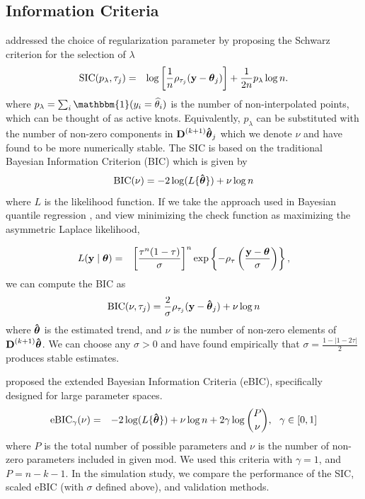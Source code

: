 \documentclass[aoas]{imsart}
\newcommand{\One}{\mathbbm{1}}
\newcommand{\V}[1]{{\bm{\mathbf{\MakeLowercase{#1}}}}} %
\newcommand{\VE}[2]{\MakeLowercase{#1}_{#2}} %
\newcommand{\Vhat}[1]{{\bm{\hat \mathbf{\MakeLowercase{#1}}}}} %
\newcommand{\M}[1]{{\bm{\mathbf{\MakeUppercase{#1}}}}} %
\newcommand{\Mn}[2]{\M{#1}^{(#2)}} %
\begin{document}
\subsection{Information Criteria}
\cite{KoenkerNgPortnoy1994} addressed the choice of regularization parameter by proposing the Schwarz criterion for the selection of $\lambda$
\begin{eqnarray*}
	\label{eq:SIC}
	\mbox{SIC}(p_{\lambda}, \tau_j) & = & \log\left[\frac{1}{n}\rho_{\tau_j}(\V{y} - \V{\theta}_j)\right] + \frac{1}{2n}p_{\lambda}\log n.
\end{eqnarray*}
where $p_{\lambda} = \sum_i \One(\VE{y}{i} = \widehat{\theta}_i)$ is the number of non-interpolated points, which can be thought of as active knots. Equivalently, $p_{\lambda}$ can be substituted with the number of non-zero components in $\M{D}^{(k+1)}\Vhat{\theta}_j$ which we denote $\nu$ and have found to be more numerically stable.  The SIC is based on the traditional Bayesian Information Criterion (BIC) which is given by
\begin{equation}
\mbox{BIC}(\nu) = -2\log(L\{\Vhat{\theta}\}) + \nu\log n
\end{equation}
where $L$ is the likelihood function. If we take the approach used in Bayesian quantile regression \citep{yu2001bayesian}, and view minimizing the check function as maximizing the asymmetric Laplace likelihood,

\begin{eqnarray*}
	L(\V{y} \mid \V{\theta}) & = & \left[\frac{\tau^n(1-\tau)}{\sigma}\right]^n\exp\left\{-\rho_\tau\left(\frac{\V{y} - \V{\theta}}{\sigma}\right)\right\},
\end{eqnarray*}
we can compute the BIC as
\begin{eqnarray*}
	\mbox{BIC}(\nu, \tau_j) = \frac{2}{\sigma}\rho_{\tau_j}(\V{y}-\Vhat{\theta}_j) + \nu\log n
\end{eqnarray*}
where $\Vhat{\theta}$ is the estimated trend, and $\nu$ is the number of non-zero elements of $\Mn{D}{k+1}\Vhat{\theta}$. We can choose any $\sigma>0$ and have found empirically that $\sigma =  \frac{1-|1-2\tau|}{2}$ produces stable estimates.

\cite{chen2008} proposed the extended Bayesian Information Criteria (eBIC), specifically designed for large parameter spaces.
\begin{eqnarray*}
	\label{eq:eBIC}
	\mbox{eBIC}_{\gamma}(\nu) & = & -2\log(L\{\Vhat{\theta}\}) + \nu\log n  + 2\gamma\log{P \choose \nu},~~\gamma \in [0,1]
\end{eqnarray*}
where $P$ is the total number of possible parameters and $\nu$ is the number of non-zero parameters included in given mod. We used this criteria with $\gamma = 1$, and $P=n-k-1$. In the simulation study, we compare the performance of the SIC, scaled eBIC (with $\sigma$ defined above), and validation methods. 
\end{document}
